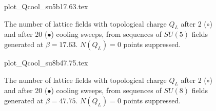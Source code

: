 \documentclass[12pt]{article}
\begin{document}







\clearpage



\begin{figure}[htb]
\begin	{center}
\leavevmode
	{plot_Qcool_su5b17.63.tex}
\end	{center}
\caption{The number of lattice fields with topological charge $Q_L$ after 2 ($\circ$) and after 20 ($\bullet$)
cooling sweeps, from sequences of $SU(5)$ fields generated at $\beta=17.63$. $N(Q_L)=0$ points suppressed.}
\label{fig_Qcool20_su5}
\end{figure}


\begin{figure}[htb]
\begin	{center}
\leavevmode
	{plot_Qcool_su8b47.75.tex}
\end	{center}
\caption{The number of lattice fields with topological charge $Q_L$ after 2 ($\circ$) and after 20 ($\bullet$)
cooling sweeps, from sequences of $SU(8)$ fields generated at $\beta=47.75$. $N(Q_L)=0$ points suppressed.}
\label{fig_Qcool20_su8}
\end{figure}
\end{document}
